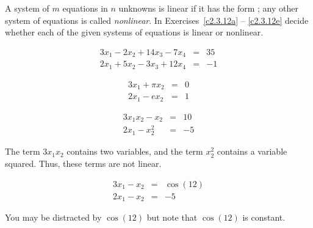 \documentclass{ximera}
\begin{document}
\noindent A system of $m$ equations in $n$ unknowns is linear if it has
the form ; any other system of equations is called 
{\em nonlinear\/}.   In Exercises~\ref{c2.3.12a} -- 
\ref{c2.3.12e} decide whether each of the given systems of equations 
is linear or nonlinear.
\begin{exercise} \label{c2.3.12a}
\[
\begin{array}{rcl}
3x_1 - 2x_2 +14x_3-7x_4 & = & 35\\
2x_1 + 5x_2 - 3x_3 + 12x_4 & = & -1
\end{array}
\]
\begin{multipleChoice}
\end{multipleChoice}
\end{exercise}
\begin{exercise} \label{c2.3.12b}
\[
\begin{array}{rcl}
3x_1 + \pi x_2  & = & 0\\
2x_1 - e x_2    & = & 1
\end{array}
\]
\begin{multipleChoice}
\end{multipleChoice}
\end{exercise}
\begin{exercise} \label{c2.3.12c}
\[
\begin{array}{rcl}
3x_1x_2 -x_2  & = & 10\\
2x_1 -   x_2^2    & = & -5
\end{array}
\]
\begin{multipleChoice}
\end{multipleChoice}
\begin{hint}
  The term $3x_1x_2$ contains two variables, and the term $x_2^2$
contains a variable squared.  Thus, these terms are not linear.
\end{hint}
\end{exercise}
\begin{exercise} \label{c2.3.12d}
\[
\begin{array}{rcl}
3x_1  -x_2  & = & \cos(12)\\
2x_1 -   x_2    & = & -5
\end{array}
\]
\begin{multipleChoice}
\end{multipleChoice}
\begin{hint}
  You may be distracted by $\cos(12)$ but note that $\cos(12)$ is constant.
\end{hint}
\end{exercise}
\end{document}
